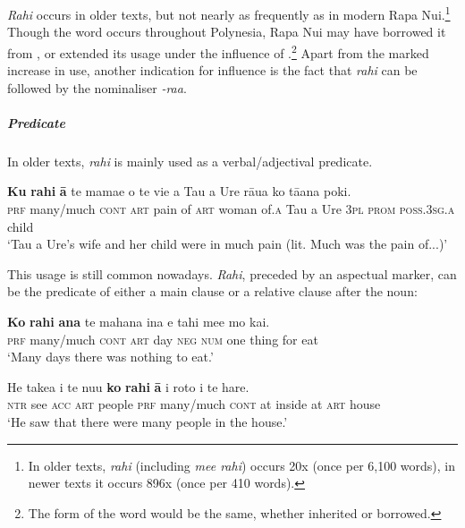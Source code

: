 \textit{Rahi} occurs in older texts, but not nearly as frequently as in modern Rapa Nui.\footnote{\label{fn:185}In older texts, \textit{rahi} (including \textit{me{\ꞌ}e rahi}) occurs 20x (once per 6,100 words), in newer texts it occurs 896x (once per 410 words).} Though the word occurs throughout Polynesia, Rapa Nui may have borrowed it from , or extended its usage under the influence of .\footnote{\label{fn:186}The form of the word would be the same, whether inherited or borrowed.}  Apart from the marked increase in use, another indication for  influence is the fact that \textit{rahi} can be followed by the  nominaliser \textit{-ra{\ꞌ}a}. 

\subparagraph{Predicate} In older texts, \textit{rahi} is mainly used as a verbal/adjectival predicate.

\ea\label{ex:4.94}
\gll \textbf{Ku} \textbf{rahi} \textbf{{\ꞌ}ā} te mamae o te vi{\ꞌ}e {\ꞌ}a Tau {\ꞌ}a Ure rāua ko  tā{\ꞌ}ana poki.\\
\textsc{prf} many/much \textsc{cont} \textsc{art} pain of \textsc{art} woman of\textsc{.a} Tau a Ure \textsc{3pl} \textsc{prom}  \textsc{poss.3sg.a} child\\

\glt
‘Tau a Ure’s wife and her child were in much pain (lit. Much was the pain of...)’ \textstyleExampleref{[Ley-9-63.019]}
\z

This usage is still common nowadays. \textit{Rahi}, preceded by an aspectual marker, can be the predicate of either a main clause or a relative clause after the noun:

\ea\label{ex:4.95}
\gll \textbf{Ko} \textbf{rahi} \textbf{{\ꞌ}ana} te mahana {\ꞌ}ina e tahi me{\ꞌ}e mo kai. \\
\textsc{prf} many/much \textsc{cont} \textsc{art} day \textsc{neg} \textsc{num} one thing for eat \\

\glt 
‘Many days there was nothing to eat.’ \textstyleExampleref{[R303.029]} 
\z

\ea\label{ex:4.96}
\gll He take{\ꞌ}a i te nu{\ꞌ}u \textbf{ko} \textbf{rahi} \textbf{{\ꞌ}ā} {\ꞌ}i roto i te hare. \\
\textsc{ntr} see \textsc{acc} \textsc{art} people \textsc{prf} many/much \textsc{cont} at inside at \textsc{art} house \\

\glt 
‘He saw that there were many people in the house.’ \textstyleExampleref{[R229.295]} 
\z

